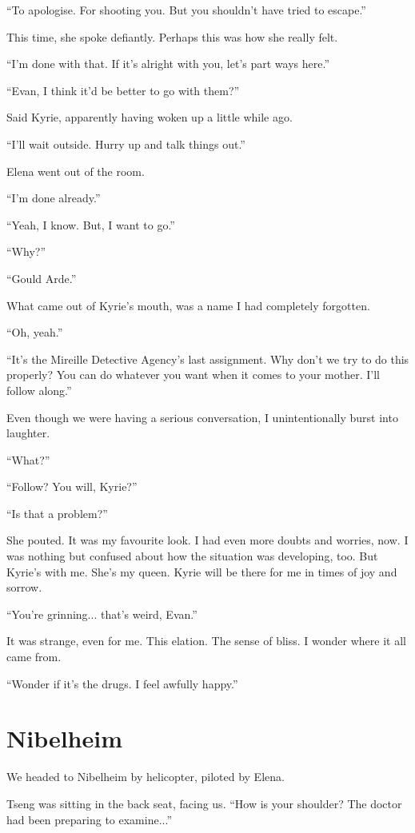 \documentclass[oneside]{book}
\begin{document}
“To apologise. For shooting you. But you shouldn’t have tried to escape.”

This time, she spoke defiantly. Perhaps this was how she really felt.

“I’m done with that. If it’s alright with you, let’s part ways here.”

“Evan, I think it’d be better to go with them?”

Said Kyrie, apparently having woken up a little while ago.

“I’ll wait outside. Hurry up and talk things out.”

Elena went out of the room.

“I’m done already.”

“Yeah, I know. But, I want to go.”

“Why?”

“Gould Arde.”

What came out of Kyrie’s mouth, was a name I had completely forgotten.

“Oh, yeah.”

“It’s the Mireille Detective Agency’s last assignment. Why don’t we try to do this properly? You can do whatever you want when it comes to your mother. I’ll follow along.”

Even though we were having a serious conversation, I unintentionally burst into laughter.

“What?”

“Follow? You will, Kyrie?”

“Is that a problem?”

She pouted. It was my favourite look. I had even more doubts and worries, now. I was nothing but confused about how the situation was developing, too. But Kyrie’s with me. She’s my queen. Kyrie will be there for me in times of joy and sorrow.

“You’re grinning... that’s weird, Evan.”

It was strange, even for me. This elation. The sense of bliss. I wonder where it all came from.

“Wonder if it’s the drugs. I feel awfully happy.”

\chapter{Nibelheim}
We headed to Nibelheim by helicopter, piloted by Elena.

Tseng was sitting in the back seat, facing us. “How is your shoulder? The doctor had been preparing to examine...”
\end{document}

